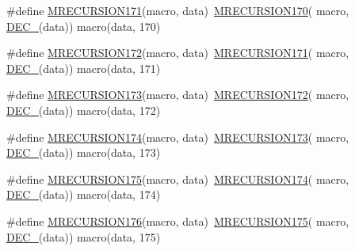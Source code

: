 \begin{DoxyCompactItemize}
\item 
\#define \mbox{\hyperlink{group__group__sam0__utils__mrecursion_ga915345baa48161291935eb1731b1f459}{M\+R\+E\+C\+U\+R\+S\+I\+O\+N171}}(macro,  data)~\mbox{\hyperlink{group__group__sam0__utils__mrecursion_gaa0c6ffd6bc8a340f3acbbb7f8ec44e2e}{M\+R\+E\+C\+U\+R\+S\+I\+O\+N170}}(  macro, \mbox{\hyperlink{group__group__sam0__utils__mrecursion_ga1d23d683797679dca8c3512a54a5dcae}{D\+E\+C\+\_\+}}(data))   macro(data, 170)
\item 
\#define \mbox{\hyperlink{group__group__sam0__utils__mrecursion_ga85f7c1151cdfbbf54a6fe28fc21c5615}{M\+R\+E\+C\+U\+R\+S\+I\+O\+N172}}(macro,  data)~\mbox{\hyperlink{group__group__sam0__utils__mrecursion_ga915345baa48161291935eb1731b1f459}{M\+R\+E\+C\+U\+R\+S\+I\+O\+N171}}(  macro, \mbox{\hyperlink{group__group__sam0__utils__mrecursion_ga1d23d683797679dca8c3512a54a5dcae}{D\+E\+C\+\_\+}}(data))   macro(data, 171)
\item 
\#define \mbox{\hyperlink{group__group__sam0__utils__mrecursion_ga783792df27d635d1463e416e45bf890e}{M\+R\+E\+C\+U\+R\+S\+I\+O\+N173}}(macro,  data)~\mbox{\hyperlink{group__group__sam0__utils__mrecursion_ga85f7c1151cdfbbf54a6fe28fc21c5615}{M\+R\+E\+C\+U\+R\+S\+I\+O\+N172}}(  macro, \mbox{\hyperlink{group__group__sam0__utils__mrecursion_ga1d23d683797679dca8c3512a54a5dcae}{D\+E\+C\+\_\+}}(data))   macro(data, 172)
\item 
\#define \mbox{\hyperlink{group__group__sam0__utils__mrecursion_ga6023acb2866bab1aaa0f09c9bc0859f1}{M\+R\+E\+C\+U\+R\+S\+I\+O\+N174}}(macro,  data)~\mbox{\hyperlink{group__group__sam0__utils__mrecursion_ga783792df27d635d1463e416e45bf890e}{M\+R\+E\+C\+U\+R\+S\+I\+O\+N173}}(  macro, \mbox{\hyperlink{group__group__sam0__utils__mrecursion_ga1d23d683797679dca8c3512a54a5dcae}{D\+E\+C\+\_\+}}(data))   macro(data, 173)
\item 
\#define \mbox{\hyperlink{group__group__sam0__utils__mrecursion_ga5cf6e0c15dc63f70fd0bea450a714a61}{M\+R\+E\+C\+U\+R\+S\+I\+O\+N175}}(macro,  data)~\mbox{\hyperlink{group__group__sam0__utils__mrecursion_ga6023acb2866bab1aaa0f09c9bc0859f1}{M\+R\+E\+C\+U\+R\+S\+I\+O\+N174}}(  macro, \mbox{\hyperlink{group__group__sam0__utils__mrecursion_ga1d23d683797679dca8c3512a54a5dcae}{D\+E\+C\+\_\+}}(data))   macro(data, 174)
\item 
\#define \mbox{\hyperlink{group__group__sam0__utils__mrecursion_gac99e671e0d43b04a1f6bb626ce84b1a7}{M\+R\+E\+C\+U\+R\+S\+I\+O\+N176}}(macro,  data)~\mbox{\hyperlink{group__group__sam0__utils__mrecursion_ga5cf6e0c15dc63f70fd0bea450a714a61}{M\+R\+E\+C\+U\+R\+S\+I\+O\+N175}}(  macro, \mbox{\hyperlink{group__group__sam0__utils__mrecursion_ga1d23d683797679dca8c3512a54a5dcae}{D\+E\+C\+\_\+}}(data))   macro(data, 175)

\end{DoxyCompactItemize}
